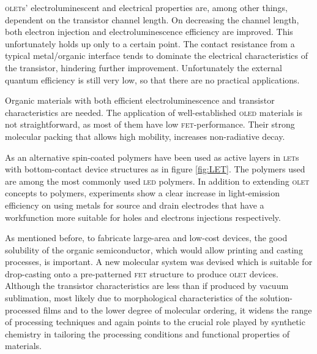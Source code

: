 \textsc{olet}s' electroluminescent and electrical properties are, among other things, dependent on the transistor channel length. On decreasing the channel length, both electron injection and electroluminescence efficiency are improved. This unfortunately holds up only to a certain point. The contact resistance from a typical metal/organic interface tends to dominate the electrical characteristics of the transistor, hindering further improvement. Unfortunately the external quantum efficiency is still very low, so that there are no practical applications. 

Organic materials with both efficient electroluminescence and transistor characteristics are needed. The application of well-established \textsc{oled} materials is not straightforward, as most of them have low \textsc{fet}-performance. Their strong molecular packing that allows high mobility, increases non-radiative decay.

As an alternative spin-coated polymers have been used as active layers in \textsc{let}s with bottom-contact device structures as in figure \ref{fig:LET}. The polymers used are among the most commonly used \textsc{led} polymers. In addition to extending \textsc{olet} concepts to polymers, experiments show a clear increase in light-emission efficiency on using metals for source and drain electrodes that have a workfunction more suitable for holes and electrons injections respectively.

As mentioned before, to fabricate large-area and low-cost devices, the good solubility of the organic semiconductor, which would allow printing and casting processes, is important. A new molecular system was devised which is suitable for drop-casting onto a pre-patterned \textsc{fet} structure to produce \textsc{olet} devices. Although the transistor characteristics are less than if produced by vacuum sublimation, most likely due to morphological characteristics of the solution-processed films and to the lower degree of molecular ordering, it widens the range of processing techniques and again points to the crucial role played by synthetic chemistry in tailoring the processing conditions and functional properties of materials.